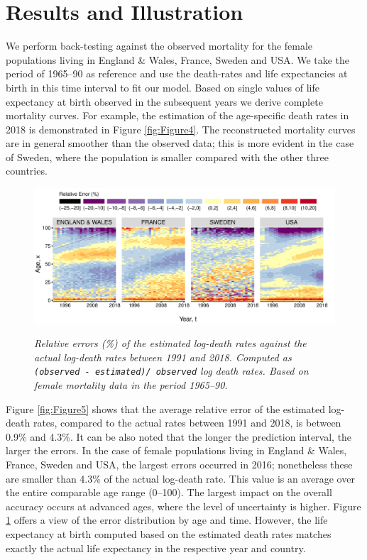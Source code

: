 \documentclass[risks,article,submit,moreauthors,pdftex]{Definitions/mdpi}
\begin{document}
\section{Results and Illustration}\label{sec:Results}

We perform back-testing against the observed mortality for the female populations living in England \& Wales, France, Sweden and USA. We take the period of 1965--90 as reference and use the death-rates and life expectancies at birth in this time interval to fit our model. Based on single values of life expectancy at birth observed in the subsequent years we derive complete mortality curves. For example, the estimation of the age-specific death rates in 2018 is demonstrated in Figure \ref{fig:Figure4}. The reconstructed mortality curves are in general smoother than the observed data; this is more evident in the case of Sweden, where the population is smaller compared with the other three countries.

\begin{figure}[!b]

{\centering \includegraphics[width=1\linewidth]{Figure6-1}}

\caption{\textit{Relative errors (\%) of the estimated log-death rates against the actual log-death rates between 1991 and 2018. Computed as \texttt{(observed  - estimated)/ observed} log death rates. Based on female mortality data in the period 1965--90.}}\label{fig:Figure6}
\end{figure}

Figure \ref{fig:Figure5} shows that the average relative error of the estimated log-death rates, compared to the actual rates between 1991 and 2018, is between 0.9\% and 4.3\%. It can be also noted that the longer the prediction interval, the larger the errors. In the case of female populations living in England \& Wales, France, Sweden and USA, the largest errors occurred in 2016; nonetheless these are smaller than 4.3\% of the actual log-death rate. This value is an average over the entire comparable age range (0--100). The largest impact on the overall accuracy occurs at advanced ages, where the level of uncertainty is higher. Figure \ref{fig:Figure6} offers a view of the error distribution by age and time. However, the life expectancy at birth computed based on the estimated death rates matches exactly the actual life expectancy in the respective year and country. 
\end{document}
